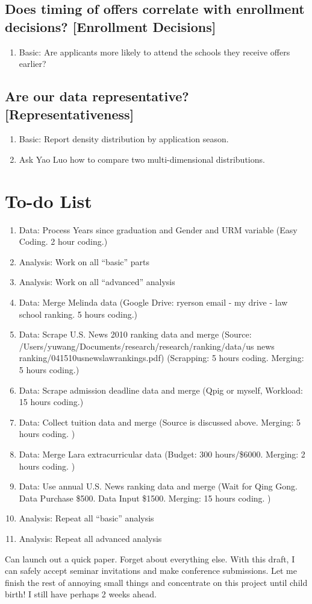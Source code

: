 \documentclass[12pt]{article}
\begin{document}
\subsection{Does timing of offers correlate with enrollment decisions? [Enrollment Decisions]}
\begin{enumerate}
\item Basic: Are applicants more likely to attend the schools they receive offers earlier?
\end{enumerate}

\subsection{Are our data representative? [Representativeness]}
\begin{enumerate}
\item Basic: Report density distribution by application season.
\item Ask Yao Luo how to compare two multi-dimensional distributions.
\end{enumerate}

\section{To-do List}
\begin{enumerate}
\item Data: Process Years since graduation and Gender and URM variable (Easy Coding. 2 hour coding.)
\item Analysis: Work on all ``basic'' parts
\item Analysis: Work on all ``advanced'' analysis
\item Data: Merge Melinda data (Google Drive: ryerson email - my drive - law school ranking. 5 hours coding.)
\item Data: Scrape U.S. News 2010 ranking data and merge (Source: /Users/yuwang/Documents/research/research/ranking/data/us news ranking/041510usnewslawrankings.pdf) (Scrapping: 5 hours coding. Merging: 5 hours coding.)
\item Data: Scrape admission deadline data and merge (Qpig or myself, Workload: 15 hours coding.)
\item Data: Collect tuition data and merge (Source is discussed above. Merging: 5 hours coding. )
\item Data: Merge Lara extracurricular data (Budget: 300 hours/\$6000. Merging: 2 hours coding. )
\item Data: Use annual U.S. News ranking data and merge (Wait for Qing Gong. Data Purchase \$500. Data Input \$1500. Merging: 15 hours coding. )
\item Analysis: Repeat all ``basic'' analysis 
\item Analysis: Repeat all advanced analysis 
\end{enumerate}
Can launch out a quick paper. Forget about everything else. With this draft, I can safely accept seminar invitations and make conference submissions. Let me finish the rest of annoying small things and concentrate on this project until child birth! I still have perhaps 2 weeks ahead. 
\end{document}
